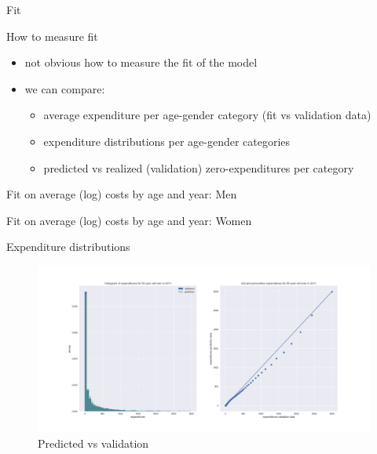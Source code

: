 \documentclass[presentation]{beamer}
\begin{document}
\begin{frame}[label={sec:org1abe136}]{Fit}
\begin{block}{How to measure fit}
\begin{itemize}
\item not obvious how to measure the fit of the model
\item we can compare: 
\begin{itemize}
\item average expenditure per age-gender category (fit vs validation data)
\item expenditure distributions per age-gender categories
\item predicted vs realized (validation) zero-expenditures per category
\end{itemize}
\end{itemize}
\end{block}

\begin{block}{Fit on average (log) costs by age and year: Men}

\end{block}

\begin{block}{Fit on average (log) costs by age and year: Women}

\end{block}

\begin{block}{Expenditure distributions}
\begin{figure}[htbp]
\centering
\includegraphics[width=500px]{./PredictedvsValidationDistributions_healthy_Male.png}
\caption{\label{fig:predictedvsValidationDistributions}
Predicted vs validation}
\end{figure}
\end{block}


\end{frame}
\end{document}
